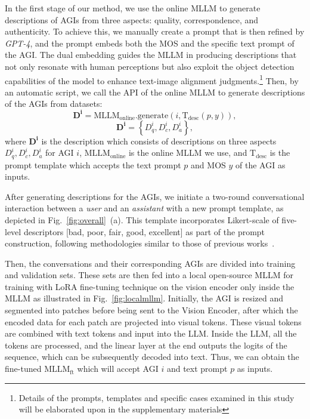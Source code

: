 In the first stage of our method, we use the online MLLM to generate descriptions of AGIs from three aspects: quality, correspondence, and authenticity.
To achieve this, we manually create a prompt that is then refined by \textit{GPT-4}, and the prompt embeds both the MOS and the specific text prompt of the AGI.
The dual embedding guides the MLLM in producing descriptions that not only resonate with human perceptions but also exploit the object detection capabilities of the model to enhance text-image alignment judgments.\footnote{Details of the prompts, templates and specific cases examined in this study will be elaborated upon in the supplementary materials}
Then, by an automatic script, we call the API of the online MLLM to generate descriptions of the AGIs from datasets:
\begin{equation}
    \boldsymbol{D^i} = \textrm{MLLM}_\textrm{online}.\textrm{generate}\left(i, \textrm{T}_\textrm{desc}\left(p, y\right)\right),
\end{equation}
\begin{equation}
    \boldsymbol{D^i} = \left\{D^i_q, D^i_c, D^i_a\right\},
\end{equation}
where $\boldsymbol{D^i}$ is the description which consists of descriptions on three aspects $D^i_q, D^i_c, D^i_a$ for AGI $i$, $\textrm{MLLM}_\textrm{online}$ is the online MLLM we use, and $\textrm{T}_\textrm{desc}$ is the prompt template which accepts the text prompt $p$ and MOS $y$ of the AGI as inputs.

After generating descriptions for the AGIs, we initiate a two-round conversational interaction between a \textit{user} and an \textit{assistant} with a new prompt template, as depicted in Fig.~\ref{fig:overall}~(a).
This template incorporates Likert-scale of five-level descriptors [bad, poor, fair, good, excellent] as part of the prompt construction, following methodologies similar to those of previous works~\cite{ghadiyaram2015massive, zhang2023blind, wu2023qalign, zhu2024adaptive}.

Then, the conversations and their corresponding AGIs are divided into training and validation sets.
These sets are then fed into a local open-source MLLM for training with LoRA fine-tuning technique on the vision encoder only inside the MLLM as illustrated in Fig.~\ref{fig:localmllm}.
Initially, the AGI is resized and segmented into patches before being sent to the Vision Encoder, after which the encoded data for each patch are projected into visual tokens.
These visual tokens are combined with text tokens and input into the LLM.
Inside the LLM, all the tokens are processed, and the linear layer at the end outputs the logits of the sequence, which can be subsequently decoded into text.
Thus, we can obtain the fine-tuned $\textrm{MLLM}_\textrm{ft}$ which will accept AGI $i$ and text prompt $p$ as inputs.

